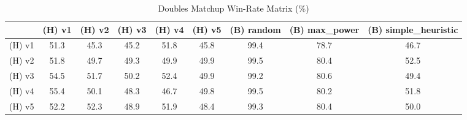 \begin{table}[htbp]
\caption{Doubles Matchup Win-Rate Matrix (\%)}
\label{tab:doubles_win_rate_gen9}
\begin{tabular}{lcccccccc}
\hline
 & (H) v1 & (H) v2 & (H) v3 & (H) v4 & (H) v5 & (B) random & (B) max\_power & (B) simple\_heuristic \\
\hline
(H) v1 & 51.3 & 45.3 & 45.2 & 51.8 & 45.8 & 99.4 & 78.7 & 46.7 \\
(H) v2 & 51.8 & 49.7 & 49.3 & 49.9 & 49.9 & 99.5 & 80.4 & 52.5 \\
(H) v3 & 54.5 & 51.7 & 50.2 & 52.4 & 49.9 & 99.2 & 80.6 & 49.4 \\
(H) v4 & 55.4 & 50.1 & 48.3 & 46.7 & 49.8 & 99.5 & 80.2 & 51.8 \\
(H) v5 & 52.2 & 52.3 & 48.9 & 51.9 & 48.4 & 99.3 & 80.4 & 50.0 \\
\hline
\end{tabular}
\end{table}
